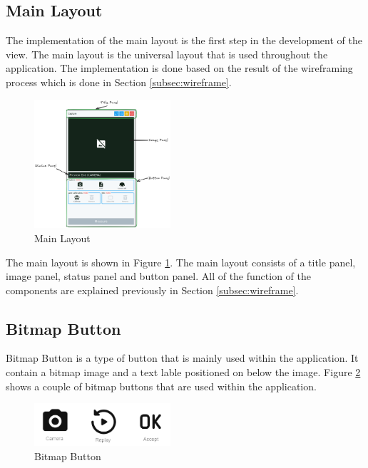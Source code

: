 \subsection {Main Layout}
The implementation of the main layout is the first step in the development of the view. The main layout is the universal layout that is used throughout the application. The implementation is done based on the result of the wireframing process which is done in Section \ref{subsec:wireframe}.

\begin{figure}[!ht]
    \centering
    \includegraphics[width=0.45\textwidth]{texs/Part2/chapter4/image/mainlayout.png}
    \caption{Main Layout}
    \label{fig:main_layout}
\end{figure}

The main layout is shown in Figure \ref{fig:main_layout}. The main layout consists of a title panel, image panel, status panel and button panel. All of the function of the components are explained previously in Section \ref{subsec:wireframe}.



\subsection{Bitmap Button}
Bitmap Button is a type of button that is mainly used within the application. It contain a bitmap image and a text lable positioned on below the image. Figure \ref{fig:bitmap_button} shows a couple of bitmap buttons that are used within the application.

\begin{figure}[!ht]
    \centering
    \includegraphics[width=0.45\textwidth]{texs/Part2/chapter4/image/bitmapbutton.png}
    \caption{Bitmap Button}
    \label{fig:bitmap_button}
\end{figure}

